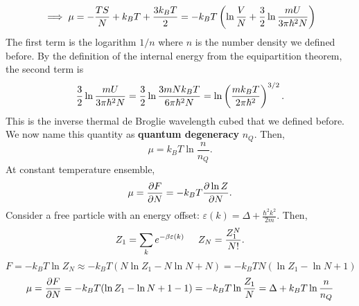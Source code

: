        \begin{equation}
            \implies \mu = -\frac{TS}{N}+k_BT+\frac{3k_BT}{2} = -k_BT\left( \ln\frac{V}{N}+\frac{3}{2}\ln\frac{mU}{3\pi\hbar^2N} \right)
        \end{equation}
        The first term is the logarithm $1/n$ where $n$ is the number density we defined before. By the definition of the internal energy from the equipartition theorem, the second term is
        \begin{equation}
            \frac{3}{2}\ln\frac{mU}{3\pi\hbar^2N}=\frac{3}{2}\ln\frac{3mNk_BT}{6\pi\hbar^2N}=\ln\left( \frac{mk_BT}{2\pi\hbar^2} \right)^{3/2}.
        \end{equation}
        This is the inverse thermal de Broglie wavelength cubed that we defined before. We now name this quantity as \textbf{quantum degeneracy} $n_Q$. Then,
        \begin{equation}
            \mu=k_BT\ln\frac{n}{n_Q}.
        \end{equation}
        At constant temperature ensemble,
        \begin{equation}
            \mu=\frac{\partial F}{\partial N}=-k_BT \frac{\partial \ln Z}{\partial N}.
        \end{equation}
        Consider a free particle with an energy offset: $\varepsilon(k)=\Delta + \frac{\hbar^2k^2}{2m}$. Then,
        \begin{equation}
            Z_1 = \sum_ke^{-\beta\varepsilon(k)} \hspace{0.5cm} Z_N = \frac{Z_1^N}{N!}.
        \end{equation}
        \begin{equation}
            F = -k_BT\ln Z_N\approx -k_BT(N\ln Z_1-N\ln N+N)=-k_BTN(\ln Z_1-\ln N+1)
        \end{equation}
        \begin{equation}
            \mu = \frac{\partial F}{\partial N}=-k_BT(\ln Z_1-\ln N +1-1)=-k_BT\ln\frac{Z_1}{N} = \Delta + k_BT\ln\frac{n}{n_Q}
        \end{equation}

